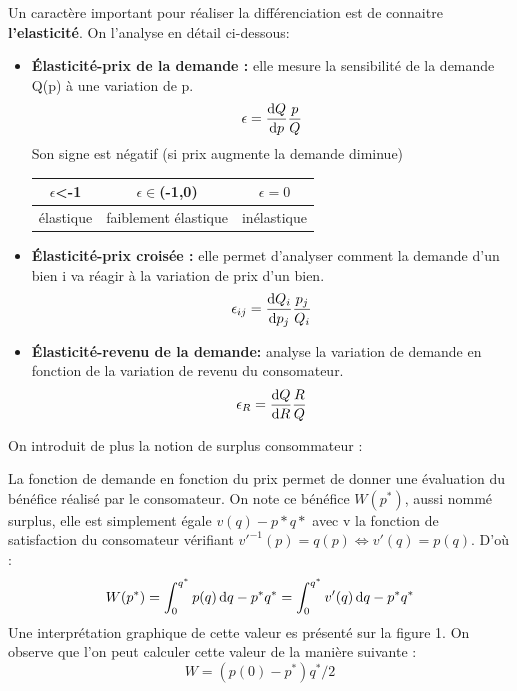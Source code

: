 Un caractère important pour réaliser la différenciation est de connaitre \textbf{l'elasticité}. On l'analyse en détail ci-dessous:

\begin{tcolorbox}[title=Élasticités]
	\begin{itemize}[label=]
		\item \textbf{Élasticité-prix de la demande :} elle mesure la sensibilité de la demande Q(p) à une variation de p. 
		\[
			\epsilon = \frac{\operatorname{d}\! Q}{\operatorname{d}\! p}\frac{p}{Q}
		\]
		Son signe est négatif (si prix augmente la demande diminue)
		\begin{tabular}{|c|c|c|}
		\hline
		$\epsilon$<-1 & $\epsilon \in$(-1,0) & $\epsilon =0$ \\
		\hline 
		élastique & faiblement élastique & inélastique \\
		\hline
		\end{tabular}
	
	
	
		\item \textbf{Élasticité-prix croisée :} elle permet d'analyser comment la demande d'un bien i va réagir à la variation de prix d'un bien.
		\[
			\epsilon_{ij} = \frac{\operatorname{d}\! Q_i}{\operatorname{d}\! p_j}\frac{p_j}{Q_i}
		\]
		\item \textbf{Élasticité-revenu de la demande:} analyse la variation de demande en fonction de la variation de revenu du consomateur.
		\[
			\epsilon_R = \frac{\operatorname{d}\! Q}{\operatorname{d}\! R}\frac{R}{Q}
		\]
	\end{itemize}
\end{tcolorbox}

On introduit de plus la notion de surplus consommateur : 
\begin{tcolorbox}[title=Surplus consommateur]
	La fonction de demande en fonction du prix permet de donner une évaluation du bénéfice réalisé par le consomateur. On note ce bénéfice $W(p^*)$, aussi nommé surplus, elle est simplement égale $v(q)-p*q*$ avec v la fonction de satisfaction du consomateur vérifiant $v'^{-1}(p)=q(p) \Leftrightarrow v'(q)=p(q)$. D'où :
	\[
		W(p^*)= \int_0^{q^*}p(q)\operatorname{d}\! q - p^*q^* = \int_0^{q^*}v'(q)\operatorname{d}\! q - p^*q^*
	\]
Une interprétation graphique de cette valeur es présenté sur la figure 1. On observe que l'on peut calculer cette valeur de la manière suivante :
\[
	W=(p(0)-p^*)q^*/2
\]

\end{tcolorbox}

